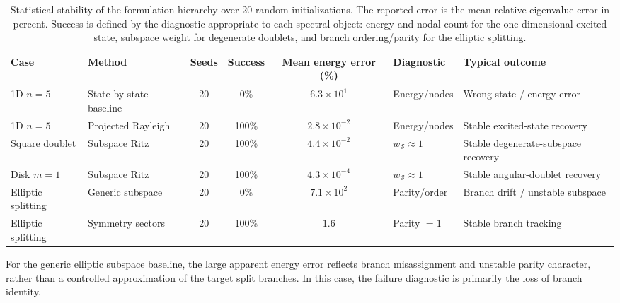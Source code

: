 \documentclass[10pt,onecolumn]{article}
\begin{document}
\begin{table}[!htbp]
\centering
\caption{Statistical stability of the formulation hierarchy over 20 random initializations. The reported error is the mean relative eigenvalue error in percent. Success is defined by the diagnostic appropriate to each spectral object: energy and nodal count for the one-dimensional excited state, subspace weight for degenerate doublets, and branch ordering/parity for the elliptic splitting.}
\label{tab:ablation}
\scriptsize
\begin{tabularx}{\textwidth}{@{} p{2.4cm} p{2.6cm} c c c p{2.2cm} X @{}}
\toprule
Case & Method & Seeds & Success & Mean energy error (\%) & Diagnostic & Typical outcome \\
\midrule
1D $n=5$ & State-by-state baseline & 20 & 0\% & $6.3\times10^{1}$ & Energy/nodes & Wrong state / energy error \\
1D $n=5$ & Projected Rayleigh & 20 & 100\% & $2.8\times10^{-2}$ & Energy/nodes & Stable excited-state recovery \\
Square doublet & Subspace Ritz & 20 & 100\% & $4.4\times10^{-2}$ & $w_{\mathcal{S}}\approx1$ & Stable degenerate-subspace recovery \\
Disk $m=1$ & Subspace Ritz & 20 & 100\% & $4.3\times10^{-4}$ & $w_{\mathcal{S}}\approx1$ & Stable angular-doublet recovery \\
Elliptic splitting & Generic subspace & 20 & 0\% & $7.1\times10^{2}$ & Parity/order & Branch drift / unstable subspace \\
Elliptic splitting & Symmetry sectors & 20 & 100\% & $1.6$ & Parity $=1$ & Stable branch tracking \\
\bottomrule
\end{tabularx}
\end{table}
\FloatBarrier

For the generic elliptic subspace baseline, the large apparent energy error reflects branch misassignment and unstable parity character, rather than a controlled approximation of the target split branches. In this case, the failure diagnostic is primarily the loss of branch identity.
\end{document}
